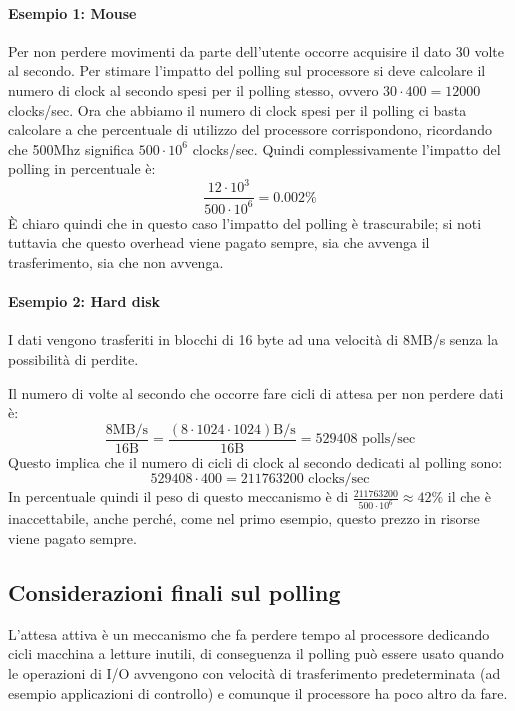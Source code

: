 \documentclass[class=book, crop=false, oneside]{standalone}
\begin{document}
\paragraph{Esempio 1: Mouse} Per non perdere movimenti da parte dell'utente occorre acquisire il dato 30 volte al secondo. Per stimare l'impatto del polling sul processore si deve calcolare il numero di clock al secondo spesi per il polling stesso, ovvero \(30\cdot 400 = 12000\) clocks/sec. Ora che abbiamo il numero di clock spesi per il polling ci basta calcolare a che percentuale di utilizzo del processore corrispondono, ricordando che 500Mhz significa \(500\cdot10^{6}\) clocks/sec. Quindi complessivamente l'impatto del polling in percentuale è:
\begin{equation*}
	\frac{12\cdot 10^3}{500\cdot 10^6}=0.002\%
\end{equation*}
È chiaro quindi che in questo caso l'impatto del polling è trascurabile; si noti tuttavia che questo overhead viene pagato sempre, sia che avvenga il trasferimento, sia che non avvenga.

\paragraph{Esempio 2: Hard disk} I dati vengono trasferiti in blocchi di 16 byte ad una velocità di \unit{8}{MB/s} senza la possibilità di perdite.

Il numero di volte al secondo che occorre fare cicli di attesa per non perdere dati è:
\begin{equation*}
	\frac{8\textrm{MB/s}}{16\textrm{B}} = \frac{(8\cdot 1024\cdot 1024)\textrm{B/s}}{16\textrm{B}} = 529408\textrm{ polls/sec}
\end{equation*}
Questo implica che il numero di cicli di clock al secondo dedicati al polling sono:
\begin{equation*}
	529408\cdot400 = 211763200\textrm{ clocks/sec}
\end{equation*}
In percentuale quindi il peso di questo meccanismo è di \(\frac{211763200}{500\cdot10^6}\approx 42\%\) il che è inaccettabile, anche perché, come nel primo esempio, questo prezzo in risorse viene pagato sempre.

\subsection{Considerazioni finali sul polling}
L'attesa attiva è un meccanismo che fa perdere tempo al processore dedicando cicli macchina a letture inutili, di conseguenza il polling può essere usato quando le operazioni di I/O avvengono con velocità di trasferimento predeterminata (ad esempio applicazioni di controllo) e comunque il processore ha poco altro da fare.
\end{document}
